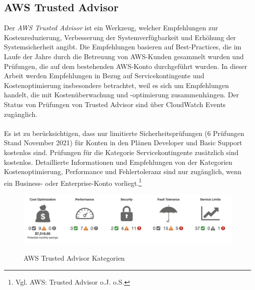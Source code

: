 \subsection{AWS Trusted Advisor}
Der \textit{AWS Trusted Advisor} ist ein Werkzeug, welcher Empfehlungen zur Kostenreduzierung, Verbesserung der Systemverfügbarkeit und Erhöhung der Systemsicherheit angibt. Die Empfehlungen basieren auf Best-Practices, die im Laufe der Jahre durch die Betreuung von AWS-Kunden gesammelt wurden und Prüfungen, die auf dem bestehenden AWS-Konto durchgeführt wurden.
In dieser Arbeit werden Empfehlungen in Bezug auf Servicekontingente und Kostenoptimierung insbesondere betrachtet, weil es sich um Empfehlungen handelt, die mit Kostenüberwachung und -optimierung zusammenhängen. Der Status von Prüfungen von Trusted Advisor sind über CloudWatch Events zugänglich. 
\\\\
Es ist zu berücksichtigen, dass nur limitierte Sicherheitsprüfungen (6 Prüfungen Stand November 2021) für Konten in den Plänen Developer und Basic Support kostenlos sind. Prüfungen für die Kategorie Servicekontingente zusätzlich sind kostenlos. Detaillierte Informationen und Empfehlungen von der Kategorien Kostenoptimierung, Performance und Fehlertoleranz sind nur zugänglich, wenn ein Business- oder Enterprise-Konto vorliegt.\footnote{Vgl. AWS: Trusted Advisor o.J. o.S.\cite{AMZ20}}
\\
\begin{figure}[h!]
      \centering
      \includegraphics[scale=0.4]{sources/AWS_Trusted_Advisor_Kategorien}
      \caption[AWS Trusted Advisor Kategorien]{}
      \label{fig:AWS_Trusted_Advisor_Kategorien} 
      AWS Trusted Advisor Kategorien\cite{AMZ20}
\end{figure}
